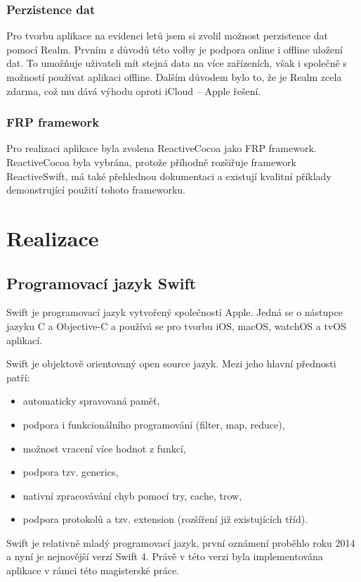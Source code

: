 \documentclass[thesis=M,czech]{FITthesis}[2012/06/26]
\begin{document}
\subsection{Perzistence dat}
Pro tvorbu aplikace na evidenci letů jsem si zvolil možnost perzistence dat pomocí Realm. Prvním z důvodů této volby je podpora online i offline uložení dat. To umožňuje uživateli mít stejná data na více zařízeních, však i společně s možností používat aplikaci offline. Dalším důvodem bylo to, že je Realm zcela zdarma, což mu dává výhodu oproti iCloud -- Apple řešení.

\subsection{FRP framework}
Pro realizaci aplikace byla zvolena ReactiveCocoa jako FRP framework. ReactiveCocoa byla vybrána, protože příhodně rozšiřuje framework ReactiveSwift, má také přehlednou dokumentaci a existují kvalitní příklady demonstrující použití tohoto frameworku.

\chapter{Realizace}
\label{chap:realizace}

\section{Programovací jazyk Swift}
Swift je programovací jazyk vytvořený společností Apple. Jedná se o nástupce jazyku C a Objective-C a používá se pro tvorbu iOS, macOS, watchOS a tvOS aplikací.

Swift je objektově orientovaný open source jazyk. Mezi jeho hlavní přednosti patří: 
\begin{itemize}
\item automaticky spravovaná paměť,
\item podpora i funkcionálního programování (filter, map, reduce),
\item možnost vracení  více  hodnot z funkcí,
\item podpora tzv. generics,
\item nativní zpracovávání chyb pomocí try, cache, trow,
\item podpora protokolů a tzv. extension (rozšíření již existujících tříd). \cite{swift}
\end{itemize}

Swift je relativně mladý programovací jazyk, první oznámení proběhlo roku 2014 a nyní je nejnovější verzí Swift 4. Právě v této verzi byla implementována aplikace v rámci této magisterské práce. \cite{swift2}
\end{document}
